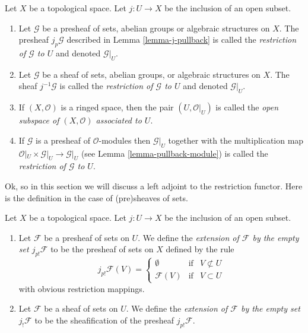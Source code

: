 \begin{definition}
\label{definition-restriction}
Let $X$ be a topological space.
Let $j : U \to X$ be the inclusion of an open subset.
\begin{enumerate}
\item Let $\mathcal{G}$ be a presheaf of sets, abelian groups or
algebraic structures on $X$. The presheaf $j_p\mathcal{G}$ described
in Lemma \ref{lemma-j-pullback} is called
the {\it restriction of $\mathcal{G}$ to $U$} and denoted $\mathcal{G}|_U$.
\item Let $\mathcal{G}$ be a sheaf of sets, abelian groups, or
algebraic structures on $X$. The sheaf $j^{-1}\mathcal{G}$ is called
the {\it restriction of $\mathcal{G}$ to $U$} and denoted $\mathcal{G}|_U$.
\item If $(X, \mathcal{O})$ is a ringed space, then the pair
$(U, \mathcal{O}|_U)$ is called the
{\it open subspace of $(X, \mathcal{O})$ associated to $U$}.
\item If $\mathcal{G}$ is a presheaf of $\mathcal{O}$-modules
then $\mathcal{G}|_U$ together with the multiplication map
$\mathcal{O}|_U \times \mathcal{G}|_U \to \mathcal{G}|_U$
(see Lemma \ref{lemma-pullback-module})
is called the {\it restriction of $\mathcal{G}$ to $U$}.
\end{enumerate}
\end{definition}

\noindent
Ok, so in this section we will
discuss a left adjoint to the restriction functor.
Here is the definition in the case of (pre)sheaves
of sets.

\begin{definition}
\label{definition-j-shriek}
Let $X$ be a topological space.
Let $j : U \to X$ be the inclusion of an open subset.
\begin{enumerate}
\item Let $\mathcal{F}$ be a presheaf of sets on $U$. We define
the {\it extension of $\mathcal{F}$ by the empty set $j_{p!}\mathcal{F}$}
to be the presheaf of sets on $X$ defined by the rule
$$
j_{p!}\mathcal{F}(V) =
\left\{
\begin{matrix}
\emptyset & \text{if} & V \not \subset U \\
\mathcal{F}(V) & \text{if} & V \subset U
\end{matrix}
\right.
$$
with obvious restriction mappings.
\item Let $\mathcal{F}$ be a sheaf of sets on $U$. We define
the {\it extension of $\mathcal{F}$ by the empty set $j_!\mathcal{F}$}
to be the sheafification of the presheaf $j_{p!}\mathcal{F}$.
\end{enumerate}
\end{definition}

